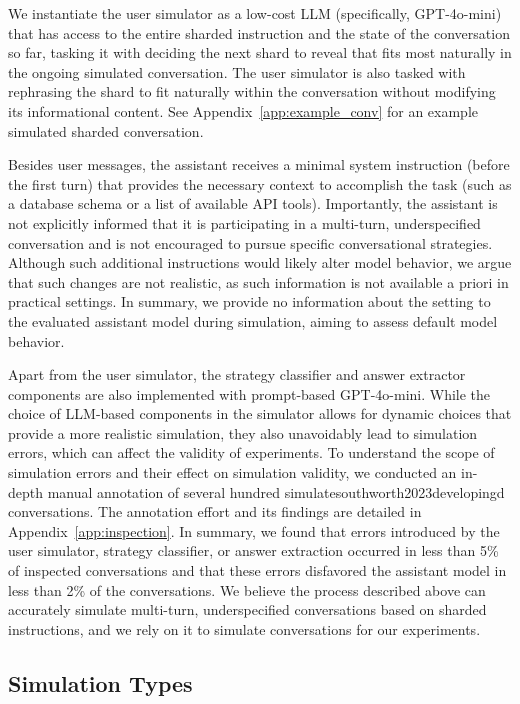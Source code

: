 \documentclass{article}
\begin{document}
We instantiate the user simulator as a low-cost LLM (specifically, GPT-4o-mini) that has access to the entire sharded instruction and the state of the conversation so far, tasking it with deciding the next shard to reveal that fits most naturally in the ongoing simulated conversation. The user simulator is also tasked with rephrasing the shard to fit naturally within the conversation without modifying its informational content. See Appendix~\ref{app:example_conv} for an example simulated sharded conversation.

Besides user messages, the assistant receives a minimal system instruction (before the first turn) that provides the necessary context to accomplish the task (such as a database schema or a list of available API tools). Importantly, the assistant is not explicitly informed that it is participating in a multi-turn, underspecified conversation and is not encouraged to pursue specific conversational strategies. Although such additional instructions would likely alter model behavior, we argue that such changes are not realistic, as such information is not available a priori in practical settings. In summary, we provide no information about the setting to the evaluated assistant model during simulation, aiming to assess default model behavior.

Apart from the user simulator, the strategy classifier and answer extractor components are also implemented with prompt-based GPT-4o-mini. While the choice of LLM-based components in the simulator allows for dynamic choices that provide a more realistic simulation, they also unavoidably lead to simulation errors, which can affect the validity of experiments. To understand the scope of simulation errors and their effect on simulation validity, we conducted an in-depth manual annotation of several hundred simulatesouthworth2023developingd conversations. The annotation effort and its findings are detailed in Appendix~\ref{app:inspection}. In summary, we found that errors introduced by the user simulator, strategy classifier, or answer extraction occurred in less than 5\% of inspected conversations and that these errors disfavored the assistant model in less than 2\% of the conversations. We believe the process described above can accurately simulate multi-turn, underspecified conversations based on sharded instructions, and we rely on it to simulate conversations for our experiments.

\subsection{Simulation Types} \label{sec:five_simulations}
\end{document}
